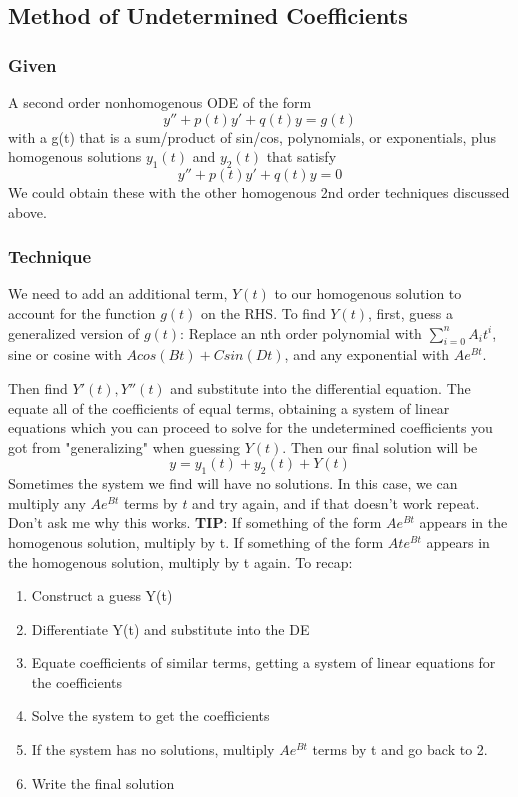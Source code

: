 \documentclass[11pt]{article}
\begin{document}
\subsection{Method of Undetermined Coefficients}
\subsubsection{Given}
A second order nonhomogenous ODE of the form
    \[ y'' + p(t)y' + q(t)y = g(t) \]
with a g(t) that is a sum/product of sin/cos, polynomials, or exponentials,
plus homogenous solutions $y_1(t)$ and $y_2(t)$ that satisfy
    \[ y'' + p(t)y' + q(t)y = 0 \]
We could obtain these with the other homogenous 2nd order techniques discussed above. 
\subsubsection{Technique}
We need to add an additional term, $Y(t)$ to our homogenous solution to account for the function $g(t)$
on the RHS. To find $Y(t)$, first, guess a generalized version of $g(t)$: Replace an nth order polynomial
with $\sum_{i=0}^n A_it^i$, sine or cosine with $Acos(Bt) + Csin(Dt)$, and any exponential with
$Ae^{Bt}$.

Then find $Y'(t), Y''(t)$ and substitute into the differential equation. The equate all of the coefficients
of equal terms, obtaining a system of linear equations which you can proceed to solve for the undetermined
coefficients you got from "generalizing" when guessing $Y(t)$. Then our final solution will be
    \[ y = y_1(t) + y_2(t) + Y(t) \]
Sometimes the system we find will have no solutions. In this case, we can multiply any $Ae^{Bt}$ terms 
by $t$ and try again, and if that doesn't work repeat. Don't ask me why this works. \textbf{TIP}: If something 
of the form $Ae^{Bt}$ appears in the homogenous solution, multiply by t. If something of the form $Ate^{Bt}$ 
appears in the homogenous solution, multiply by t again. 
To recap:
\begin{enumerate}
    \item Construct a guess Y(t)
    \item Differentiate Y(t) and substitute into the DE
    \item Equate coefficients of similar terms, getting a system of linear equations for the coefficients
    \item Solve the system to get the coefficients
    \item If the system has no solutions, multiply $Ae^{Bt}$ terms by t and go back to 2.
    \item Write the final solution
\end{enumerate}
\end{document}
